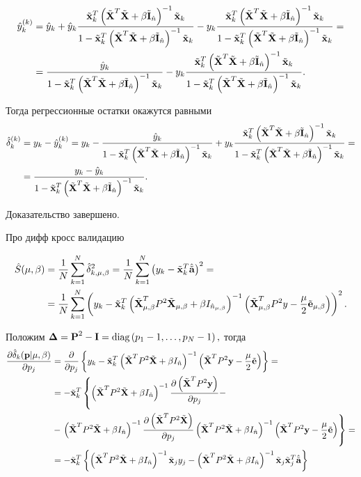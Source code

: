 \begin{Proof}

\begin{align*}
	\hat y\this_k
		&= \hat y_k + \hat y_k\frac{\tilde{\mb x}_k^T\inv{\A} \tilde{\mb x}_k}{\denominator}
		- y_k\frac{\tilde{\mb x}^T_k\inv{\A}\tilde{\mb x}_k}{\denominator} = \\
		&= \frac{\hat y_k}{\denominator} - y_k\frac{\tilde{\mb x}^T_k\inv{\A}\tilde{\mb x}_k}{\denominator}.
\end{align*}

Тогда регрессионные остатки окажутся равными
\begin{align*}
	\hat{\delta}_k\this
	&= y_k - \hat y\this_k = y_k - \frac{\hat y_k}{\denominator} + y_k\frac{\tilde{\mb x}^T_k\inv{\A}\tilde{\mb x}_k}{\denominator} = \\
	&= \frac{y_k - \hat y_k}{\denominator}.
\end{align*}

Доказательство завершено.
\end{Proof}

\begin{theorem}
Про дифф кросс валидацию
\end{theorem}

\begin{align}
	\hat S(\lams)
	&= \frac1N\suml_{k=1}^N\hat\delta_{k, \lams}^2
	= \frac1N\suml_{k=1}^N\cbr{y_k - \tilde {\mb x}_k^T \besta}^2 = \\
	&= \frac1N\suml_{k=1}^N
		\cbr{y_k - \tilde {\mb x}_k^T
		\inv{\tilde{\mb X}^T_\lams P^2\tilde{\mb X}_\lams + \beta I_{\hat n_\lams}}
		\cbr{\tilde{\mb X}^T_\lams P^2 y - \frac\mu2\tilde{\mb e}_\lams}
	}^2.
\end{align}

Положим $\mb \Delta = \mb P^2 - \mb I = \diag{p_1 - 1, \ldots, p_N - 1},$ тогда
\begin{align}
	\dd{\hat\delta_k(\mb p \cond \lams)}{p_j}
	&= 	\dd{}{p_j}
		\fbr{
			y_k - \tilde {\mb x}_k^T \inv{\tilde{\mb X}^T P^2\tilde{\mb X} + \beta I_{\hat n}}
			\cbr{\tilde{\mb X}^T P^2 \mb y -\frac\mu2\tilde{\mb e}}
		} = \\
	&= - \tilde {\mb x}_k^T
	\left\{
		\inv{\tilde{\mb X}^T P^2\tilde{\mb X} + \beta I_{\hat n}}
	  	\dd{\cbr{\tilde{\mb X}^T P^2 \mb y}}{p_j} -
	  	\right. \\
	&- 	\left.
	   	\inv{\tilde{\mb X}^T P^2\tilde{\mb X} + \beta I_{\hat n}}
		\dd{\cbr{\tilde{\mb X}^T P^2\tilde{\mb X}}}{p_j}
		\inv{\tilde{\mb X}^T P^2\tilde{\mb X} + \beta I_{\hat n}}
		\cbr{\tilde{\mb X}^T P^2 \mb y -\frac\mu2\tilde{\mb e}}
	\right\} = \\
	&= - \tilde {\mb x}_k^T
	\fbr{
		\inv{\tilde{\mb X}^T P^2\tilde{\mb X} + \beta I_{\hat n}}
		\tilde{\mb x}_jy_j
		-
		\inv{\tilde{\mb X}^T P^2\tilde{\mb X} + \beta I_{\hat n}}
		\tilde{\mb x}_j \tilde{\mb x}^T_j
		\besta
	}
\end{align}

